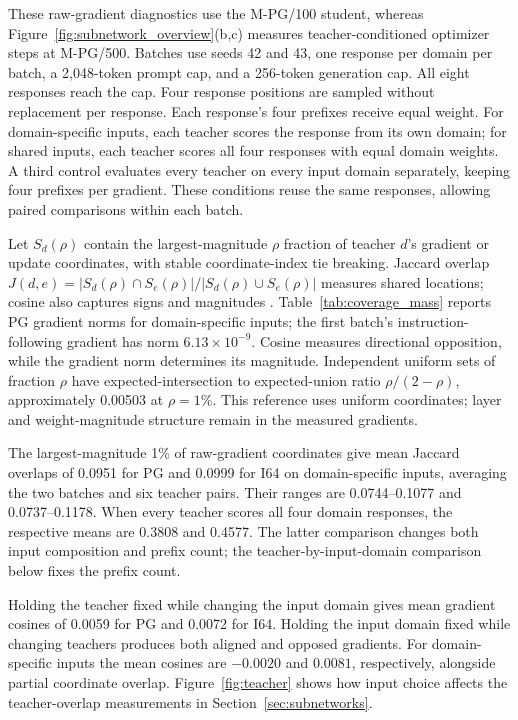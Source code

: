 These raw-gradient diagnostics use the M-PG/100 student, whereas Figure~\ref{fig:subnetwork_overview}(b,c) measures teacher-conditioned optimizer steps at M-PG/500. Batches use seeds 42 and 43, one response per domain per batch, a 2,048-token prompt cap, and a 256-token generation cap. All eight responses reach the cap. Four response positions are sampled without replacement per response. Each response's four prefixes receive equal weight. For domain-specific inputs, each teacher scores the response from its own domain; for shared inputs, each teacher scores all four responses with equal domain weights. A third control evaluates every teacher on every input domain separately, keeping four prefixes per gradient. These conditions reuse the same responses, allowing paired comparisons within each batch.

Let $S_d(\rho)$ contain the largest-magnitude $\rho$ fraction of teacher $d$'s gradient or update coordinates, with stable coordinate-index tie breaking. Jaccard overlap $J(d,e)=|S_d(\rho)\cap S_e(\rho)|/|S_d(\rho)\cup S_e(\rho)|$ measures shared locations; cosine also captures signs and magnitudes \citep{yu2026denseupdates}. Table~\ref{tab:coverage_mass} reports PG gradient norms for domain-specific inputs; the first batch's instruction-following gradient has norm $6.13\times10^{-9}$. Cosine measures directional opposition, while the gradient norm determines its magnitude. Independent uniform sets of fraction $\rho$ have expected-intersection to expected-union ratio $\rho/(2-\rho)$, approximately 0.00503 at $\rho=1\%$. This reference uses uniform coordinates; layer and weight-magnitude structure remain in the measured gradients.

The largest-magnitude 1\% of raw-gradient coordinates give mean Jaccard overlaps of 0.0951 for PG and 0.0999 for I64 on domain-specific inputs, averaging the two batches and six teacher pairs. Their ranges are 0.0744--0.1077 and 0.0737--0.1178. When every teacher scores all four domain responses, the respective means are 0.3808 and 0.4577. The latter comparison changes both input composition and prefix count; the teacher-by-input-domain comparison below fixes the prefix count.

Holding the teacher fixed while changing the input domain gives mean gradient cosines of 0.0059 for PG and 0.0072 for I64. Holding the input domain fixed while changing teachers produces both aligned and opposed gradients. For domain-specific inputs the mean cosines are $-0.0020$ and $0.0081$, respectively, alongside partial coordinate overlap. Figure~\ref{fig:teacher} shows how input choice affects the teacher-overlap measurements in Section~\ref{sec:subnetworks}.

